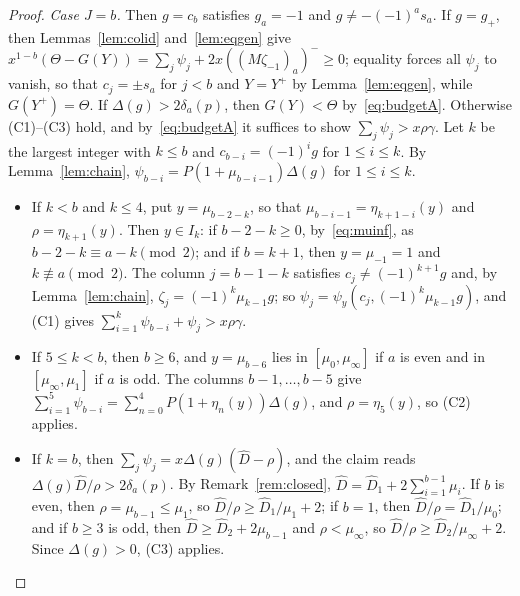 \documentclass[11pt]{article}
\theoremstyle{remark}
\begin{document}
\begin{proof}
\emph{Case $J=b$.} Then $g=c_b$ satisfies $g_a=-1$ and $g\ne-(-1)^as_a$. If
$g=g_+$, then Lemmas~\ref{lem:colid} and~\ref{lem:eqgen} give
$x^{1-b}(\Theta-G(Y))=\sum_j\psi_j+2x((M\zeta_{-1})_a)^-\ge0$; equality forces
all $\psi_j$ to vanish, so that $c_j=\pm s_a$ for $j<b$ and $Y=Y^+$ by
Lemma~\ref{lem:eqgen}, while $G(Y^+)=\Theta$. If $\Delta(g)>2\delta_a(p)$,
then $G(Y)<\Theta$ by~\eqref{eq:budgetA}. Otherwise (C1)--(C3) hold, and
by~\eqref{eq:budgetA} it suffices to show $\sum_j\psi_j>x\rho\gamma$. Let $k$
be the largest integer with $k\le b$ and $c_{b-i}=(-1)^ig$ for $1\le i\le k$.
By Lemma~\ref{lem:chain}, $\psi_{b-i}=P(1+\mu_{b-i-1})\Delta(g)$ for
$1\le i\le k$.
\begin{itemize}
\item If $k<b$ and $k\le4$, put $y=\mu_{b-2-k}$, so that
 $\mu_{b-i-1}=\eta_{k+1-i}(y)$ and $\rho=\eta_{k+1}(y)$. Then $y\in I_k$:
 if $b-2-k\ge0$, by~\eqref{eq:muinf}, as $b-2-k\equiv a-k\pmod2$; and if
 $b=k+1$, then $y=\mu_{-1}=1$ and $k\not\equiv a\pmod2$. The column
 $j=b-1-k$ satisfies $c_j\ne(-1)^{k+1}g$ and, by Lemma~\ref{lem:chain},
 $\zeta_j=(-1)^k\mu_{k-1}g$; so $\psi_j=\psi_y(c_j,(-1)^k\mu_{k-1}g)$, and
 (C1) gives $\sum_{i=1}^{k}\psi_{b-i}+\psi_j>x\rho\gamma$.
\item If $5\le k<b$, then $b\ge6$, and $y=\mu_{b-6}$ lies in
 $[\mu_0,\mu_\infty]$ if $a$ is even and in $[\mu_\infty,\mu_1]$ if $a$ is
 odd. The columns $b-1,\dots,b-5$ give
 $\sum_{i=1}^{5}\psi_{b-i}=\sum_{n=0}^{4}P(1+\eta_n(y))\Delta(g)$, and
 $\rho=\eta_5(y)$, so (C2) applies.
\item If $k=b$, then $\sum_j\psi_j=x\Delta(g)(\hat D-\rho)$, and the claim
 reads $\Delta(g)\hat D/\rho>2\delta_a(p)$. By Remark~\ref{rem:closed},
 $\hat D=\hat D_1+2\sum_{i=1}^{b-1}\mu_i$. If $b$ is even, then
 $\rho=\mu_{b-1}\le\mu_1$, so $\hat D/\rho\ge\hat D_1/\mu_1+2$; if $b=1$,
 then $\hat D/\rho=\hat D_1/\mu_0$; and if $b\ge3$ is odd, then
 $\hat D\ge\hat D_2+2\mu_{b-1}$ and $\rho<\mu_\infty$, so
 $\hat D/\rho\ge\hat D_2/\mu_\infty+2$. Since $\Delta(g)>0$, (C3) applies.
 \qedhere
\end{itemize}
\end{proof}
\end{document}
